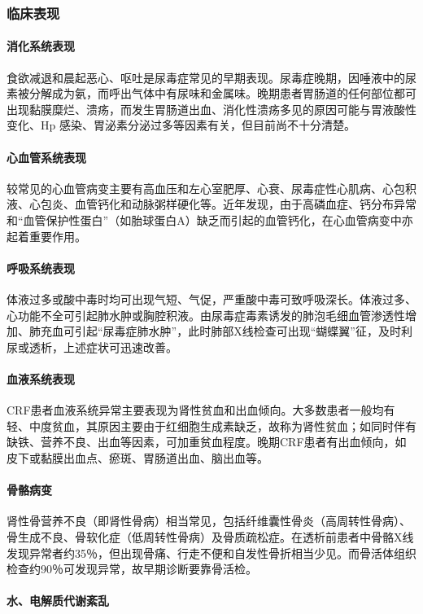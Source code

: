 \subsubsection{临床表现}
\paragraph{消化系统表现}

食欲减退和晨起恶心、呕吐是尿毒症常见的早期表现。尿毒症晚期，因唾液中的尿素被分解成为氨，而呼出气体中有尿味和金属味。晚期患者胃肠道的任何部位都可出现黏膜糜烂、溃疡，而发生胃肠道出血、消化性溃疡多见的原因可能与胃液酸性变化、{Hp}
感染、胃泌素分泌过多等因素有关，但目前尚不十分清楚。
\paragraph{心血管系统表现}

较常见的心血管病变主要有高血压和左心室肥厚、心衰、尿毒症性心肌病、心包积液、心包炎、血管钙化和动脉粥样硬化等。近年发现，由于高磷血症、钙分布异常和“血管保护性蛋白”（如胎球蛋白A）缺乏而引起的血管钙化，在心血管病变中亦起着重要作用。
\paragraph{呼吸系统表现}

体液过多或酸中毒时均可出现气短、气促，严重酸中毒可致呼吸深长。体液过多、心功能不全可引起肺水肿或胸腔积液。由尿毒症毒素诱发的肺泡毛细血管渗透性增加、肺充血可引起“尿毒症肺水肿”，此时肺部X线检查可出现“蝴蝶翼”征，及时利尿或透析，上述症状可迅速改善。
\paragraph{血液系统表现}

CRF患者血液系统异常主要表现为肾性贫血和出血倾向。大多数患者一般均有轻、中度贫血，其原因主要由于红细胞生成素缺乏，故称为肾性贫血；如同时伴有缺铁、营养不良、出血等因素，可加重贫血程度。晚期CRF患者有出血倾向，如皮下或黏膜出血点、瘀斑、胃肠道出血、脑出血等。
\paragraph{骨骼病变}

肾性骨营养不良（即肾性骨病）相当常见，包括纤维囊性骨炎（高周转性骨病）、骨生成不良、骨软化症（低周转性骨病）及骨质疏松症。在透析前患者中骨骼X线发现异常者约35％，但出现骨痛、行走不便和自发性骨折相当少见。而骨活体组织检查约90％可发现异常，故早期诊断要靠骨活检。
\paragraph{水、电解质代谢紊乱}

